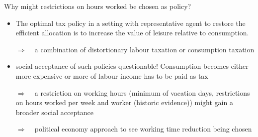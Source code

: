 \documentclass[11pt,aspectratio=169]{beamer}
\newcommand{\ar}{$\Rightarrow$ \ }
\begin{document}
\begin{frame}{Why might restrictions on hours worked be chosen as policy?}
\begin{itemize}
\item \cite{Alvarez-Cuadrado2007EnvyHours}
The optimal tax policy in a setting with representative agent to restore the efficient allocation is to increase the value of leisure relative to consumption.
\item[\ar] a combination of distortionary labour taxation or consumption taxation
\item social acceptance of such policies questionable! Consumption becomes either more expensive or more of labour income has to be paid as tax
\item[\ar] a restriction on working hours (minimum of vacation days, restrictions on hours worked per week and worker (historic evidence)) might gain a broader social acceptance
\item[\ar] political economy approach to see working time reduction being chosen
\end{itemize}
\end{frame}
\end{document}
